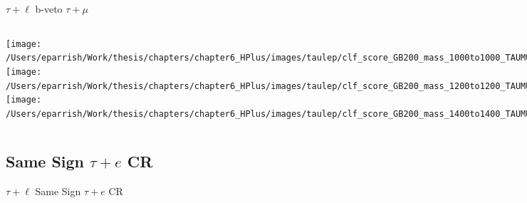 \documentclass[aspectratio=169,xcolor=table]{beamer}
\begin{document}
    \begin{frame}[t]{$\tau+\ell$ b-veto $\tau+\mu$}
      \begin{columns}[t]
          \texttt{[image: /Users/eparrish/Work/thesis/chapters/chapter6\_HPlus/images/taulep/clf\_score\_GB200\_mass\_1000to1000\_TAUMU\_BVETO.png]}
          \texttt{[image: /Users/eparrish/Work/thesis/chapters/chapter6\_HPlus/images/taulep/clf\_score\_GB200\_mass\_1200to1200\_TAUMU\_BVETO.png]}
          \texttt{[image: /Users/eparrish/Work/thesis/chapters/chapter6\_HPlus/images/taulep/clf\_score\_GB200\_mass\_1400to1400\_TAUMU\_BVETO.png]}

          \texttt{[image: /Users/eparrish/Work/thesis/chapters/chapter6\_HPlus/images/taulep/clf\_score\_GB200\_mass\_1600to1600\_TAUMU\_BVETO.png]}
          \texttt{[image: /Users/eparrish/Work/thesis/chapters/chapter6\_HPlus/images/taulep/clf\_score\_GB200\_mass\_1800to1800\_TAUMU\_BVETO.png]}
          \texttt{[image: /Users/eparrish/Work/thesis/chapters/chapter6\_HPlus/images/taulep/clf\_score\_GB200\_mass\_2000to2000\_TAUMU\_BVETO.png]}

          \texttt{[image: /Users/eparrish/Work/thesis/chapters/chapter6\_HPlus/images/taulep/clf\_score\_GB200\_mass\_2500to2500\_TAUMU\_BVETO.png]}
          \texttt{[image: /Users/eparrish/Work/thesis/chapters/chapter6\_HPlus/images/taulep/clf\_score\_GB200\_mass\_3000to3000\_TAUMU\_BVETO.png]}


      \end{columns}
    \end{frame}

  \subsection{Same Sign $\tau+e$ CR}

    \begin{frame}[c]{$\tau+\ell$ Same Sign $\tau+e$ CR}
      \begin{table}
      \end{table}
    \end{frame}
\end{document}
